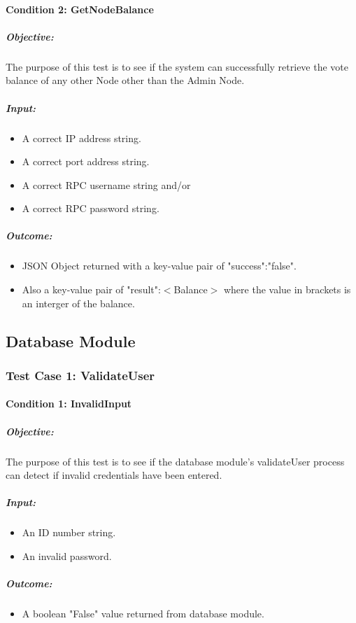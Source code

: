 \documentclass[11pt]{article}
\begin{document}
	\paragraph{Condition 2: GetNodeBalance}	
	\subparagraph{Objective:}
	The purpose of this test is to see if the system can successfully retrieve the vote balance of any other Node other than the Admin Node.
	\subparagraph{Input:}
	\begin{itemize}
		\item A correct IP address string.
		\item A correct port address string.
		\item A correct RPC username string and/or
		\item A correct RPC password string.
	\end{itemize}
	\subparagraph{Outcome:}
	\begin{itemize}
		\item JSON Object returned with a key-value pair of "success":"false".
		\item Also a key-value pair of "result":$<$Balance$>$ where the value in brackets is an interger of the balance.
	\end{itemize}
	
	\subsection{Database Module}
	\label{sec:DatabaseModuleTestCases}
	\subsubsection{Test Case 1: ValidateUser}
	\paragraph{Condition 1: InvalidInput}	
	\subparagraph{Objective:}
	The purpose of this test is to see if the database module's validateUser process can detect if invalid credentials have been entered.
	\subparagraph{Input:}
	\begin{itemize}
		\item An ID number string.
		\item An invalid password.
	\end{itemize}
	\subparagraph{Outcome:}
	\begin{itemize}
		\item A boolean "False" value returned from database module.
	\end{itemize}
	
\end{document}
